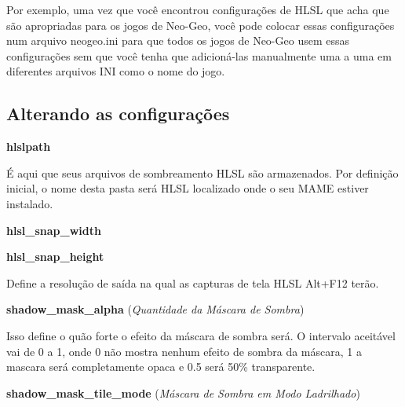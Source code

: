 \documentclass[letterpaper,10pt,brazil]{sphinxmanual}
\begin{document}
Por exemplo, uma vez que você encontrou configurações de HLSL que acha
que são apropriadas para os jogos de Neo-Geo, você pode colocar essas
configurações num arquivo neogeo.ini para que todos os jogos de Neo-Geo
usem essas configurações sem que você tenha que adicioná-las manualmente
uma a uma em diferentes arquivos INI como o nome do jogo.


\subsection{Alterando as configurações}
\label{advanced/hlsl:id2}
\begin{DUlineblock}{0em}
\item[] \textbf{hlslpath}
\item[] 
\item[]
\begin{DUlineblock}{\DUlineblockindent}
\item[] É aqui que seus arquivos de sombreamento HLSL são armazenados. Por definição inicial, o nome desta pasta será HLSL localizado onde o seu MAME estiver instalado.
\item[] 
\end{DUlineblock}
\item[] \textbf{hlsl\_snap\_width}
\item[] \textbf{hlsl\_snap\_height}
\item[] 
\item[]
\begin{DUlineblock}{\DUlineblockindent}
\item[] Define a resolução de saída na qual as capturas de tela HLSL Alt+F12 terão.
\item[] 
\end{DUlineblock}
\item[] \textbf{shadow\_mask\_alpha} (\emph{Quantidade da Máscara de Sombra})
\item[] 
\item[]
\begin{DUlineblock}{\DUlineblockindent}
\item[] Isso define o quão forte o efeito da máscara de sombra será. O intervalo aceitável vai de 0 a 1, onde 0 não mostra nenhum efeito de sombra da máscara, 1 a mascara será completamente opaca e 0.5 será 50\% transparente.
\item[] 
\end{DUlineblock}
\item[] \textbf{shadow\_mask\_tile\_mode} (\emph{Máscara de Sombra em Modo Ladrilhado})
\item[] 

\end{DUlineblock}
\end{document}
